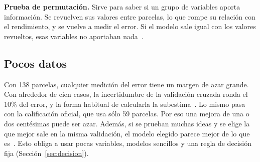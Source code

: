 \textbf{Prueba de permutación.} Sirve para saber si un grupo de variables aporta información. Se revuelven sus valores
entre parcelas, lo que rompe su relación con el rendimiento, y se vuelve a medir el error. Si el modelo sale igual
con los valores revueltos, esas variables no aportaban nada~\cite{ojala2010}.

\subsection{Pocos datos}
Con 138 parcelas, cualquier medición del error tiene un margen de azar grande. Con alrededor de cien casos, la
incertidumbre de la validación cruzada ronda el 10\% del error, y la forma habitual de calcularla la
subestima~\cite{varoquaux2018}. Lo mismo pasa con la calificación oficial, que usa sólo 59 parcelas. Por eso una
mejora de una o dos centésimas puede ser azar. Además, si se prueban muchas ideas y se elige la que mejor sale en la
misma validación, el modelo elegido parece mejor de lo que es~\cite{cawley2010}. Esto obliga a usar pocas variables,
modelos sencillos y una regla de decisión fija (Sección~\ref{sec:decision}).
